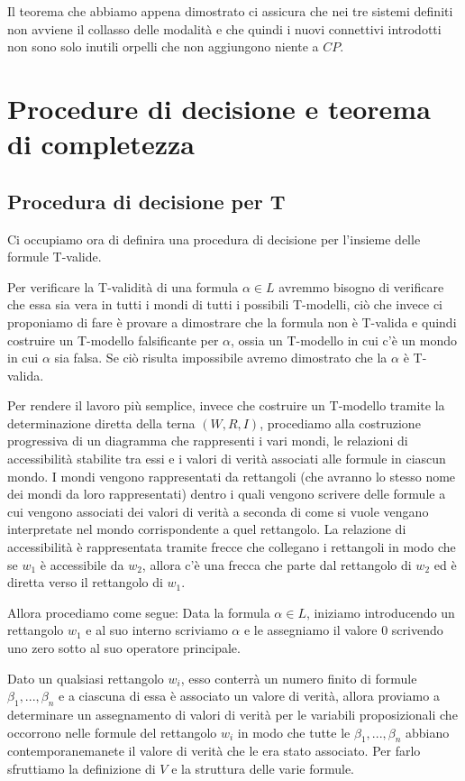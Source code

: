 \documentclass[a4paper, titlepage, 12pt]{report}
\begin{document}
Il teorema che abbiamo appena dimostrato ci assicura che nei tre sistemi definiti non avviene
il collasso delle modalità e che quindi i nuovi connettivi introdotti non sono solo inutili
orpelli che non aggiungono niente a $CP$.

\chapter{Procedure di decisione e teorema di completezza}

\section{Procedura di decisione per T}
Ci occupiamo ora di definira una procedura di decisione per l'insieme delle formule T-valide.

Per verificare la T-validità di una formula $\alpha \in L$ avremmo bisogno di verificare che essa sia vera in tutti
i mondi di tutti i possibili T-modelli, ciò che invece ci proponiamo di fare è
provare a dimostrare che la formula non è T-valida e quindi costruire un T-modello
falsificante per $\alpha$, ossia un T-modello in cui c'è un mondo in cui $\alpha$ sia falsa.
Se ciò risulta impossibile avremo dimostrato che la $\alpha$ è T-valida.

Per rendere il lavoro più semplice, invece che costruire un T-modello
tramite la determinazione diretta della terna $(W, R, I)$, procediamo alla costruzione
progressiva di un diagramma che rappresenti i vari mondi, le relazioni di accessibilità
stabilite tra essi e i valori di verità associati alle formule in ciascun mondo.
I mondi vengono rappresentati da rettangoli (che avranno lo stesso nome dei mondi
da loro rappresentati) dentro i quali
vengono scrivere delle formule a cui vengono associati
dei valori di verità a seconda di come si vuole vengano interpretate nel mondo
corrispondente a quel rettangolo. La relazione di accessibilità è rappresentata
tramite frecce che collegano i rettangoli in modo che se $w_1$ è accessibile da $w_2$,
allora c'è una frecca che parte dal rettangolo di $w_2$ ed è diretta verso il rettangolo
di $w_1$.


Allora procediamo come segue:
Data la formula $\alpha \in L$, iniziamo introducendo un rettangolo $w_1$ e
al suo interno scriviamo $\alpha$ e le assegniamo il valore $0$ scrivendo uno zero
sotto al suo operatore principale.

Dato un qualsiasi rettangolo $w_i$, esso conterrà un numero finito di formule
$\beta_1, ..., \beta_n$
e a ciascuna di essa è associato un valore di verità, allora proviamo
a determinare un assegnamento di valori di verità per le variabili proposizionali
che occorrono nelle formule del rettangolo $w_i$
in modo che tutte le $\beta_1, ..., \beta_n$
abbiano contemporanemanete il valore di verità che le era stato associato.
Per farlo sfruttiamo la definizione di $V$ e la struttura delle varie formule.
\end{document}
